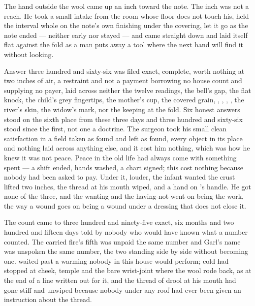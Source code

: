 The hand outside the wool came up an inch toward the note. The inch was not a reach. He took a small intake from the room whose floor does not touch his, held the interval whole on the note's own finishing under the covering, let it go as the note ended --- neither early nor stayed --- and came straight down and laid itself flat against the fold as a man puts away a tool where the next hand will find it without looking.

Answer three hundred and sixty-six was filed exact, complete, worth nothing at two inches of air, a restraint and not a payment borrowing no house count and supplying no payer, laid across neither the twelve readings, the bell's gap, the flat knock, the child's grey fingertips, the mother's cup, the covered grain, , , , , the river's skin, the widow's mark,  nor the keeping at the fold. Six honest answers stood on the sixth place from these three days and three hundred and sixty-six stood since the first, not one a doctrine. The surgeon took his small clean satisfaction in a field taken as found and left as found, every object in its place and nothing laid across anything else, and it cost him nothing, which was how he knew it was not peace. Peace in the old life had always come with something spent --- a shift ended, hands washed, a chart signed; this cost nothing because nobody had been asked to pay. Under it, louder, the infant wanted the crust lifted two inches, the thread at his mouth wiped, and a hand on 's handle. He got none of the three, and the wanting and the having-not went on being the work, the way a wound goes on being a wound under a dressing that does not close it.

The count came to three hundred and ninety-five exact, six months and two hundred and fifteen days told by nobody who would have known what a number counted. The carried fire's fifth was unpaid the same number and Garl's name was unspoken the same number, the two standing side by side without becoming one.  waited past a warming nobody in this house would perform; cold had stopped at cheek, temple and the bare wrist-joint where the wool rode back, as at the end of a line written out for it, and the thread of drool at his mouth had gone stiff and unwiped because nobody under any roof had ever been given an instruction about the thread.

